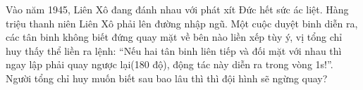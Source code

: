 Vào năm 1945, Liên Xô đang đánh nhau với phát xít Đức hết sức ác liệt. Hàng triệu thanh niên Liên Xô phải lên đường nhập ngũ. Một cuộc duyệt binh diễn ra, các tân binh không biết đứng quay mặt về bên nào liền xếp tùy ý, vị tổng chỉ huy thấy thể liền ra lệnh: “Nếu hai tân binh liên tiếp và đối mặt với nhau thì ngay lập phải quay ngược lại(180 độ), động tác này diễn ra trong vòng 1s!”. Người tổng chỉ huy muốn biết sau bao lâu thì thì đội hình sẽ ngừng quay?